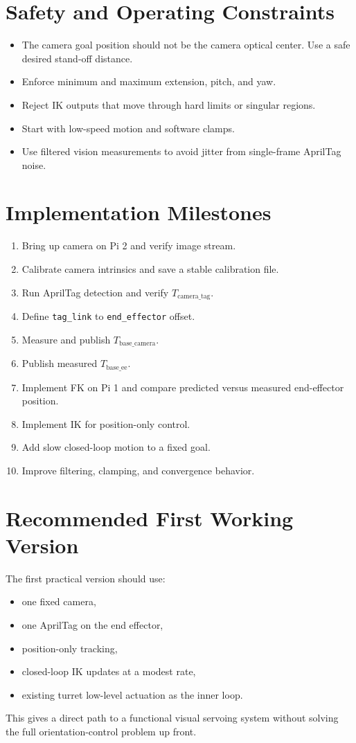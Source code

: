 \documentclass[11pt]{article}
\begin{document}
\section*{Safety and Operating Constraints}
\begin{itemize}[leftmargin=1.5em]
  \item The camera goal position should not be the camera optical center. Use a safe desired stand-off distance.
  \item Enforce minimum and maximum extension, pitch, and yaw.
  \item Reject IK outputs that move through hard limits or singular regions.
  \item Start with low-speed motion and software clamps.
  \item Use filtered vision measurements to avoid jitter from single-frame AprilTag noise.
\end{itemize}

\section*{Implementation Milestones}
\begin{enumerate}[leftmargin=1.7em]
  \item Bring up camera on Pi 2 and verify image stream.
  \item Calibrate camera intrinsics and save a stable calibration file.
  \item Run AprilTag detection and verify \(T_{\text{camera}\_\text{tag}}\).
  \item Define \texttt{tag\_link} to \texttt{end\_effector} offset.
  \item Measure and publish \(T_{\text{base}\_\text{camera}}\).
  \item Publish measured \(T_{\text{base}\_\text{ee}}\).
  \item Implement FK on Pi 1 and compare predicted versus measured end-effector position.
  \item Implement IK for position-only control.
  \item Add slow closed-loop motion to a fixed goal.
  \item Improve filtering, clamping, and convergence behavior.
\end{enumerate}

\section*{Recommended First Working Version}
The first practical version should use:
\begin{itemize}[leftmargin=1.5em]
  \item one fixed camera,
  \item one AprilTag on the end effector,
  \item position-only tracking,
  \item closed-loop IK updates at a modest rate,
  \item existing turret low-level actuation as the inner loop.
\end{itemize}

This gives a direct path to a functional visual servoing system without solving the full orientation-control problem up front.
\end{document}
